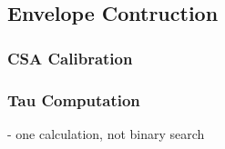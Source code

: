 \subsection{Envelope Contruction}

\subsubsection{CSA Calibration}

\subsubsection{Tau Computation}
\noindent - one calculation, not binary search